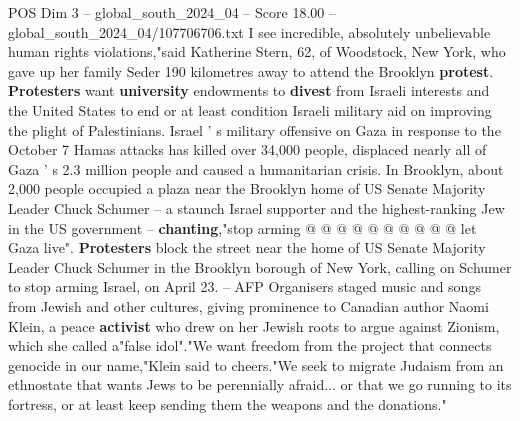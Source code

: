 \begin{textsample}{POS Dim 3 – global\_south\_2024\_04 – Score 18.00 – global\_south\_2024\_04/107706706.txt}
I see incredible, absolutely unbelievable human rights violations,"said Katherine Stern, 62, of Woodstock, New York, who gave up her family Seder 190 kilometres away to attend the Brooklyn \textbf{protest}. \textbf{Protesters} want \textbf{university} endowments to \textbf{divest} from Israeli interests and the United States to end or at least condition Israeli military aid on improving the plight of Palestinians.
Israel ' s military offensive on Gaza in response to the October 7 Hamas attacks has killed over 34,000 people, displaced nearly all of Gaza ' s 2.3 million people and caused a humanitarian crisis.
In Brooklyn, about 2,000 people occupied a plaza near the Brooklyn home of US Senate Majority Leader Chuck Schumer -- a staunch Israel supporter and the highest-ranking Jew in the US government -- \textbf{chanting},"stop arming @ @ @ @ @ @ @ @ @ @ let Gaza live". \textbf{Protesters} block the street near the home of US Senate Majority Leader Chuck Schumer in the Brooklyn borough of New York, calling on Schumer to stop arming Israel, on April 23. -- AFP Organisers staged music and songs from Jewish and other cultures, giving prominence to Canadian author Naomi Klein, a peace \textbf{activist} who drew on her Jewish roots to argue against Zionism, which she called a"false idol"."We want freedom from the project that connects genocide in our name,"Klein said to cheers."We seek to migrate Judaism from an ethnostate that wants Jews to be perennially afraid... or that we go running to its fortress, or at least keep sending them the weapons and the donations."

\end{textsample}
